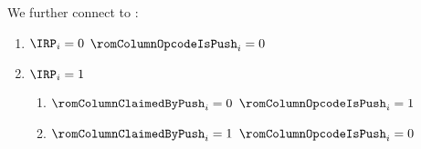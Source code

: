 We further connect \romColumnOpcodeIsPush{} to \IRP{}:
\begin{enumerate}
    \item \If $\IRP _{i} = 0$ \Then $\romColumnOpcodeIsPush _{i} = 0$
    \item \If $\IRP _{i} = 1$ \Then
        \begin{enumerate}
            \item \If $\romColumnClaimedByPush _{i} = 0$ \Then $\romColumnOpcodeIsPush _{i} = 1$
            \item \If $\romColumnClaimedByPush _{i} = 1$ \Then $\romColumnOpcodeIsPush _{i} = 0$
        \end{enumerate}
\end{enumerate}
